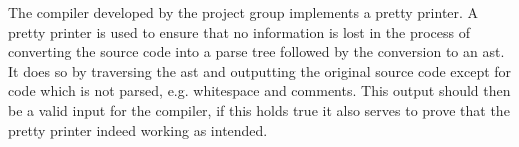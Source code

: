 The compiler developed by the project group implements a pretty printer.
A pretty printer is used to ensure that no information is lost in the process of converting the source code into a parse tree followed by the conversion to an \acrshort{ast}.
It does so by traversing the \acrshort{ast} and outputting the original source code except for code which is not parsed, e.g. whitespace and comments.
This output should then be a valid input for the compiler, if this holds true it also serves to prove that the pretty printer indeed working as intended.